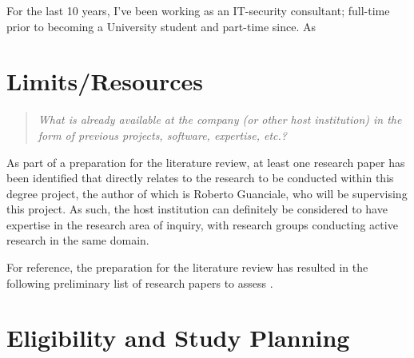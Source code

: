 \documentclass[12pt, a4paper]{article}
\begin{document}
For the last 10 years, I've been working as an IT-security consultant; full-time prior to becoming a University student and part-time since. As 

\section{Limits/Resources}

\begin{quote}
	\textit{\textit{What is already available at the company (or other host institution) in the form of previous projects, software, expertise, etc.?}}
\end{quote}

As part of a preparation for the literature review, at least one research paper \cite{sound_transpilation_from_binary_to_ir} has been identified that directly relates to the research to be conducted within this degree project, the author of which is Roberto Guanciale, who will be supervising this project. As such, the host institution can definitely be considered to have expertise in the research area of inquiry, with research groups conducting active research in the same domain.

For reference, the preparation for the literature review has resulted in the following preliminary list of research papers to assess \cite{graph_based_ir,retargetable_binary_translator,dynamic_binary_translation,uqbt_binary_translator,retargetable_static_binary_translator,ssa_for_decompilation,valgrind,bitblaze,architecture_independent_binary_analysis_and_transformation,arm_analysis_using_llvm,bap,revgen,wartell_rewriting_x86_binaries,barf,singled_graph_disassembly,dbill,instruction_idiom_detection,graph_based_higher_order_ir,reconstruction_of_instruction_idioms,extracting_instruction_semantics_via_symbolic_exectuion_of_code_generators,software_transformation,state_of_the_art_of_war,function_recovery,bin2llvm,sound_transpilation_from_binary_to_ir,cast_study_llvm_suitable_for_binary_analysis,revng,evaluation_of_irs,binrec,lifter_synthesis,superset_disassembly,b2r2,llvm_ir_lifter_using_mcsema_and_dyninst,gtirb,case_for_bap_and_angr,retrowrite}.


\section{Eligibility and Study Planning}
\end{document}
